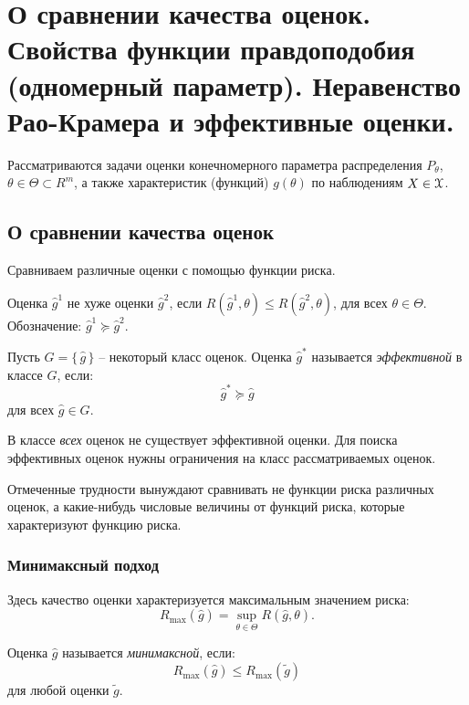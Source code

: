 \section{О сравнении качества оценок. Свойства функции правдоподобия (одномерный параметр). Неравенство Рао-Крамера и эффективные оценки.}

Рассматриваются задачи оценки конечномерного параметра распределения $P_{\theta}$, $\theta \in \Theta \subset R^m$, а также характеристик (функций) $g(\theta)$ по наблюдениям $X \in \mathcal{X}$.

\subsection{О сравнении качества оценок}
Сравниваем различные оценки с помощью функции риска.
\begin{definition}
	Оценка $\hat{g}^{1}$ не хуже оценки $\hat{g}^{2}$, если $R(\hat{g}^{1}, \theta) \leqslant R(\hat{g}^{2}, \theta)$, для всех $\theta \in \Theta$. Обозначение: $\hat{g}^{1} \succeq \hat{g}^{2}$.
\end{definition}

\begin{definition}
	Пусть $G = \{\,\hat{g}\,\}$ -- некоторый класс оценок. Оценка $\hat{g}^{*}$ называется \textit{эффективной} в классе $G$, если:
	\[
        \hat{g}^{*} \succeq \hat{g}
	\]
	для всех $\hat{g} \in G$.
\end{definition}

В классе \textit{всех} оценок не существует эффективной оценки. Для поиска эффективных оценок нужны ограничения на класс рассматриваемых оценок.

Отмеченные трудности вынуждают сравнивать не функции риска различных оценок, а какие-нибудь числовые величины от функций риска, которые характеризуют функцию риска.

\subsubsection{Минимаксный подход}
Здесь качество оценки характеризуется максимальным значением риска:
\[
    R_{\max}(\hat{g}) = \sup_{\theta \in \Theta} R(\hat{g}, \theta)
.\]

\begin{definition}
	Оценка $\hat{g}$ называется \textit{минимаксной}, если:
	\[
        R_{\max}(\hat{g}) \leqslant R_{\max}(\tilde{g})
	\]
	для любой оценки $\tilde{g}$.
\end{definition}

